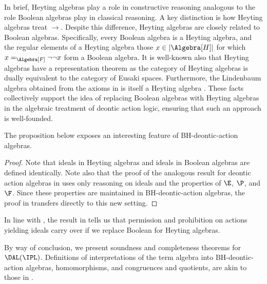In brief, Heyting algebras play a role in constructive reasoning analogous to the role Boolean algebras play in classical reasoning. A key distinction is how Heyting algebras treat $\to$.
Despite this difference, Heyting algebras are closely related to Boolean algebras.
Specifically, every Boolean algebra is a Heyting algebra, and the regular elements of a Heyting algebra \textemdash those $x 
\in |\Algebra[H]|$ for which $x =_{\Algebra[F]} \lnot\lnot x$ \textemdash form a Boolean algebra.
It is well-known also that Heyting algebras have a representation theorem \textemdash as the category of Heyting algebras is dually equivalent to the category of Eusaki spaces.
Furthermore, the Lindenbaum algebra obtained from the axioms in  is itself a Heyting algebra \cite{vanDalen:2008}.
These facts collectively support the idea of replacing Boolean algebras with Heyting algebras in the algebraic treatment of deontic action logic, ensuring that such an approach is well-founded.

The proposition below exposes an interesting feature of BH-deontic-action algebras.

\medskip
{}
\begin{proof}
	Note that ideals in Heyting algebras and ideals in Boolean algebras are defined identically.
	Note also that the proof of the analogous result for deontic action algebras in  uses only reasoning on ideals and the properties of $\E$, $\P$, and $\F$.
	Since these properties are maintained in BH-deontic-action algebras, the proof in  transfers directly to this new setting.
\end{proof}
\medskip

In line with , the result in  tells us that permission and prohibition on actions yielding ideals carry over if we replace Boolean for Heyting algebras.

By way of conclusion, we present soundness and completeness theorems for $\DAL(\IPL)$.
Definitions of interpretations of the term algebra into BH-deontic-action algebras, homomorphisms, and congruences and quotients, are akin to those in .

